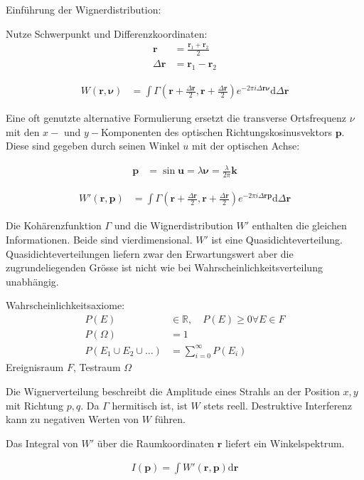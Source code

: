 \documentclass{article}
\newcommand{\vect}[1]{\mathbf{#1}}
\renewcommand{\r}{\vect r}
\newcommand{\p}{\vect p}
\renewcommand{\k}{\vect k}
\newcommand{\vnu}{\boldsymbol\nu}
\begin{document}
Einf\"uhrung der Wignerdistribution:

Nutze Schwerpunkt und Differenzkoordinaten:
\begin{align}
  \r &= \frac{\r_1+\r_2}{2} \\
  \Delta\r &= \r_1-\r_2
\end{align}


\begin{align}
  W(\r,\vnu) &= \int\Gamma\left(\r+\frac{\Delta\r}{2},\r+\frac{\Delta\r}{2}\right) e^{-2\pi i \Delta\r\vnu}\textrm{d}\Delta\r
\end{align}

Eine oft genutzte alternative Formulierung ersetzt die transverse
Ortsfrequenz $\nu$ mit den $x-$ und $y-$Komponenten des optischen
Richtungskosinusvektors $\p$. Diese sind gegeben durch seinen Winkel
$u$ mit der optischen Achse:

\begin{align}
  \p &= \sin\vect u = \lambda \vnu = \frac{\lambda}{2\pi} \k
\end{align}

\begin{align}
  W'(\r,\p) &= \int\Gamma\left(\r+\frac{\Delta\r}{2},\r+\frac{\Delta\r}{2}\right) e^{-2\pi i \Delta\r\p}\textrm{d}\Delta\r
\end{align}


Die Koh\"arenzfunktion $\Gamma$ und die Wignerdistribution $W'$
enthalten die gleichen Informationen. Beide sind vierdimensional. $W'$
ist eine Quasidichteverteilung. Quasidichteverteilungen liefern zwar
den Erwartungswert aber die zugrundeliegenden Gr\"osse ist nicht wie
bei Wahrscheinlichkeitsverteilung unabh\"angig.

Wahrscheinlichkeitsaxiome:
\begin{align}
  P(E)&\in\mathbb{R},\quad P(E)\ge 0 \forall E \in F\\
  P(\Omega) &= 1\\
  P(E_1\cup E_2\cup\ldots) &= \sum_{i=0}^\infty P(E_i)
\end{align}
Ereignisraum $F$, Testraum $\Omega$


Die Wignerverteilung beschreibt die Amplitude eines Strahls an der
Position $x, y$ mit Richtung $p, q$. Da $\Gamma$ hermitisch ist, ist
$W$ stets reell. Destruktive Interferenz kann zu negativen Werten von
$W$ f\"uhren.

Das Integral von $W'$ \"uber die Raumkoordinaten $\r$ liefert ein
Winkelspektrum.

\begin{align}
  I(\p) = \int W'(\r,\p) \textrm{d}\r
\end{align}
\end{document}
